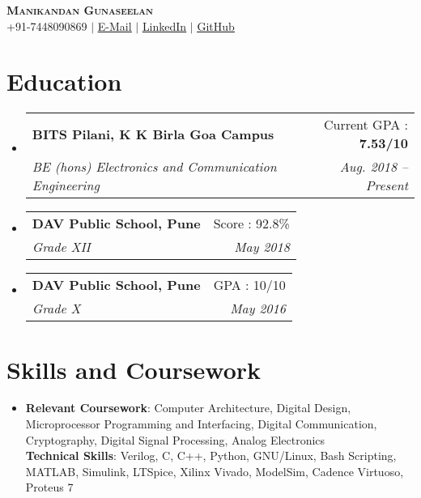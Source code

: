 \documentclass[a4paper,11pt]{article}
\makeatletter
\newcommand{\resumeSubheading}[4]{
  \vspace{-2pt}\item
    \begin{tabular*}{0.97\textwidth}[t]{l@{\extracolsep{\fill}}r}
      \textbf{#1} & #2 \\
      \textit{\small#3} & \textit{\small #4} \\
    \end{tabular*}\vspace{-7pt}
}
\newcommand{\resumeSubHeadingListStart}{\begin{itemize}[leftmargin=0.15in, label={}]}
\newcommand{\resumeSubHeadingListEnd}{\end{itemize}}
\makeatother
\begin{document}

\begin{center}
    \textbf{\Huge \scshape Manikandan Gunaseelan} \\ \vspace{1pt}
    \small +91-7448090869 $|$ \href{mailto:manikandang1729@gmail.com}{\underline{E-Mail}} $|$ 
    \href{https://linkedin.com/in/manikandan-gunaseelan}{\underline{LinkedIn}} $|$
    \href{https://github.com/manig1729}{\underline{GitHub}}
\end{center}


\section{Education}
  \resumeSubHeadingListStart
    \resumeSubheading
      {BITS Pilani, K K Birla Goa Campus}{Current GPA : \textbf{7.53/10}}
      {BE (hons) Electronics and Communication Engineering}{Aug. 2018 -- Present}
    \resumeSubheading
      {DAV Public School, Pune}{Score : 92.8\%}
      {Grade XII}{May 2018}
    \resumeSubheading
      {DAV Public School, Pune}{GPA : 10/10}
      {Grade X}{May 2016}
  \resumeSubHeadingListEnd


%
\section{Skills and Coursework}
 \begin{itemize}[leftmargin=0.15in, label={}]
    \item{
     \textbf{Relevant Coursework}{: Computer Architecture, Digital Design, Microprocessor Programming and Interfacing, Digital Communication, Cryptography, Digital Signal Processing, Analog Electronics} \\
     \vspace{1mm}
     \textbf{Technical Skills}{: Verilog, C, C++, Python,
GNU/Linux, Bash Scripting, MATLAB, Simulink, LTSpice, Xilinx Vivado, ModelSim, Cadence Virtuoso, Proteus 7} \\
    }
 \end{itemize}
\end{document}
